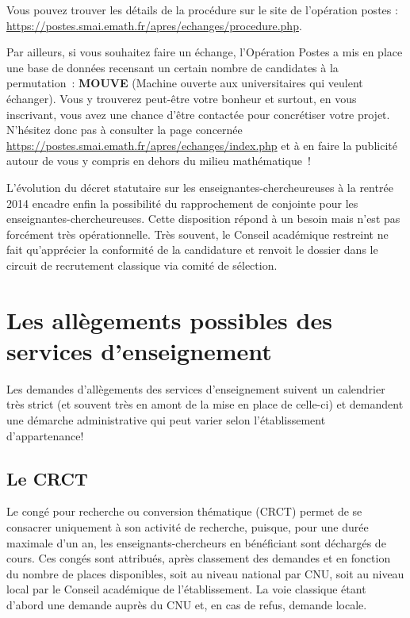 Vous pouvez trouver les d\'etails de la proc\'edure sur le site de
l'op\'eration postes : \url{https://postes.smai.emath.fr/apres/echanges/procedure.php}.

Par ailleurs, si vous souhaitez faire un \'echange, l'Op\'eration
Postes a mis en place une base de donn\'ees recensant un certain
nombre de candidat\mp e\mp s \`a la permutation~: \textbf{MOUVE} (Machine
ouverte aux universitaires qui veulent \'echanger). Vous y trouverez
peut-\^etre votre bonheur et surtout, en vous inscrivant, vous avez
une chance d'\^etre contact\'e\mp e pour concr\'etiser votre projet.
N'h\'esitez donc pas \`a consulter la page concern\'ee
\url{https://postes.smai.emath.fr/apres/echanges/index.php}
et \`a en faire la publicit\'e autour de vous
y compris en dehors du milieu math\'ematique~!

L'\'evolution du d\'ecret statutaire sur les enseignant\mp e\mp s-chercheur\mp euse\mp s \`a la rentr\'ee 2014 
encadre enfin la possibilit\'e du rapprochement de conjoint\mp e pour les enseignant\mp e\mp s-chercheur\mp euse\mp s. 
Cette disposition r\'epond \`a un besoin mais n'est pas forc\'ement tr\`es op\'erationnelle. 
Tr\`es souvent, le Conseil acad\'emique restreint ne
fait qu'appr\'ecier la conformit\'e de la candidature et renvoit le dossier dans le circuit de recrutement classique via comit\'e de s\'election.


\section{Les all\`egements possibles des services d'enseignement}

Les demandes d'all\`egements des services d'enseignement suivent un calendrier tr\`es strict
(et souvent tr\`es en amont de la mise en place de celle-ci)
et demandent une d\'emarche administrative qui peut varier selon l'\'etablissement d'appartenance!

\subsection{Le CRCT}
\label{CRCT}


Le cong\'e pour recherche ou conversion th\'ematique (CRCT) permet
de se consacrer uniquement \`a son activit\'e de recherche, puisque,
pour une dur\'ee maximale d'un an, les enseignants-chercheurs en
b\'en\'eficiant sont d\'echarg\'es de cours. Ces cong\'es sont
attribu\'es, apr\`es classement des demandes et en fonction du nombre
de places disponibles, soit au niveau national par CNU, soit  au niveau local par le Conseil
acad\'emique de l'\'etablissement. La voie classique \'etant d'abord une demande
aupr\`es du CNU et, en cas de refus, demande locale.

